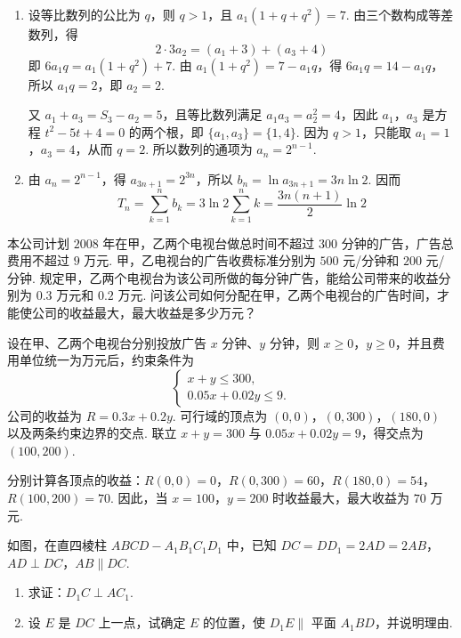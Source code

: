 \begin{solution}
\begin{enumerate}
\item 设等比数列的公比为 \(q\)，则 \(q>1\)，且 \(a_{1}\left(1+q+q^{2}\right)=7\). 由三个数构成等差数列，得
\[
2\cdot 3a_{2}=(a_{1}+3)+(a_{3}+4)
\]
即 \(6a_{1}q=a_{1}\left(1+q^{2}\right)+7\). 由 \(a_{1}\left(1+q^{2}\right)=7-a_{1}q\)，得 \(6a_{1}q=14-a_{1}q\)，所以 \(a_{1}q=2\)，即 \(a_{2}=2\).

又 \(a_{1}+a_{3}=S_{3}-a_{2}=5\)，且等比数列满足 \(a_{1}a_{3}=a_{2}^{2}=4\)，因此 \(a_{1}\)，\(a_{3}\) 是方程 \(t^{2}-5t+4=0\) 的两个根，即 \(\{a_{1},a_{3}\}=\{1,4\}\). 因为 \(q>1\)，只能取 \(a_{1}=1\)，\(a_{3}=4\)，从而 \(q=2\). 所以数列的通项为 \(a_{n}=2^{n-1}\).
\item 由 \(a_{n}=2^{n-1}\)，得 \(a_{3n+1}=2^{3n}\)，所以 \(b_{n}=\ln a_{3n+1}=3n\ln 2\). 因而
\[
T_{n}=\sum_{k=1}^{n}b_{k}=3\ln 2\sum_{k=1}^{n}k=\frac{3n(n+1)}{2}\ln 2
\]
\end{enumerate}
\end{solution}

\begin{problem}
本公司计划 \(2008\) 年在甲，乙两个电视台做总时间不超过 \(300\) 分钟的广告，广告总费用不超过 \(9\) 万元. 甲，乙电视台的广告收费标准分别为 \(500\) 元/分钟和 \(200\) 元/分钟. 规定甲，乙两个电视台为该公司所做的每分钟广告，能给公司带来的收益分别为 \(0.3\) 万元和 \(0.2\) 万元. 问该公司如何分配在甲，乙两个电视台的广告时间，才能使公司的收益最大，最大收益是多少万元？
\end{problem}

\begin{solution}
设在甲、乙两个电视台分别投放广告 \(x\) 分钟、\(y\) 分钟，则 \(x\geqslant0\)，\(y\geqslant0\)，并且费用单位统一为万元后，约束条件为
\[
\begin{cases}
x+y\leqslant300,\\
0.05x+0.02y\leqslant9.
\end{cases}
\]
公司的收益为 \(R=0.3x+0.2y\). 可行域的顶点为 \((0,0)\)，\((0,300)\)，\((180,0)\) 以及两条约束边界的交点. 联立 \(x+y=300\) 与 \(0.05x+0.02y=9\)，得交点为 \((100,200)\).

分别计算各顶点的收益：\(R(0,0)=0\)，\(R(0,300)=60\)，\(R(180,0)=54\)，\(R(100,200)=70\). 因此，当 \(x=100\)，\(y=200\) 时收益最大，最大收益为 \(70\) 万元.
\end{solution}

\begin{problem}
如图，在直四棱柱 \(ABCD - A_{1}B_{1}C_{1}D_{1}\) 中，已知 \(DC = DD_{1} = 2AD = 2AB\)，\(AD \perp DC\)，\(AB \parallel DC\).

\begin{enumerate}
\item 求证：\(D_{1}C \perp AC_{1}\).
\item 设 \(E\) 是 \(DC\) 上一点，试确定 \(E\) 的位置，使 \(D_{1}E \parallel\) 平面 \(A_{1}BD\)，并说明理由.
\end{enumerate}

\end{problem}

